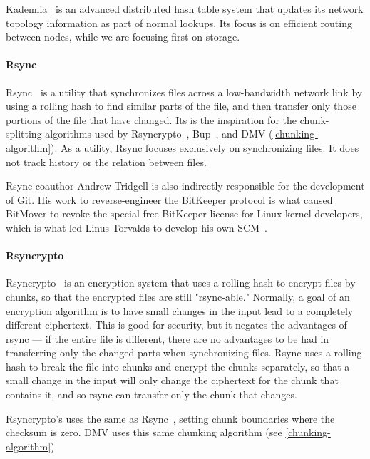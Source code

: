 Kademlia~\cite{Maymounkov2002} is an advanced distributed hash table system that updates its network topology information as part of normal lookups.
Its focus is on efficient routing between nodes, while we are focusing first on storage.


\paragraph{Rsync}
\label{related-rsync}

Rsync~\cite{rsynctechreport} is a utility that synchronizes files across a low-band\-width network link by using a rolling hash to find similar parts of the file, and then transfer only those portions of the file that have changed.
Its  is the inspiration for the chunk-splitting algorithms used by Rsyncrypto~\cite{rsyncrypto_algorithm}, Bup~\cite{bup_design}, and \gls{DMV} (\autoref{chunking-algorithm}).
As a utility, Rsync focuses exclusively on synchronizing files.
It does not track history or the relation between files.

Rsync coauthor Andrew Tridgell is also indirectly responsible for the development of Git.
His work to reverse-engineer the BitKeeper protocol is what caused BitMover to revoke the special free BitKeeper license for Linux kernel developers, which is what led Linus Torvalds to develop his own \gls{SCM}~\cite{git_10_years_interview}.


\paragraph{Rsyncrypto}
\label{related-rsyncrypto}

Rsyncrypto~\cite{rsyncrypto_algorithm} is an encryption system that uses a roll\-ing hash to encrypt files by chunks, so that the encrypted files are still "rsync-able." Normally, a goal of an encryption algorithm is to have small changes in the input lead to a completely different ciphertext.
This is good for security, but it negates the advantages of rsync --- if the entire file is different, there are no advantages to be had in transferring only the changed parts when synchronizing files.
Rsync uses a rolling hash to break the file into chunks and encrypt the chunks separately, so that a small change in the input will only change the ciphertext for the chunk that contains it, and so rsync can transfer only the chunk that changes.

Rsyncrypto's uses the same  as Rsync~\cite{rsyncrypto_algorithm,rsynctechreport}, setting chunk boundaries where the checksum is zero.
\gls{DMV} uses this same chunking algorithm (see \autoref{chunking-algorithm}).


